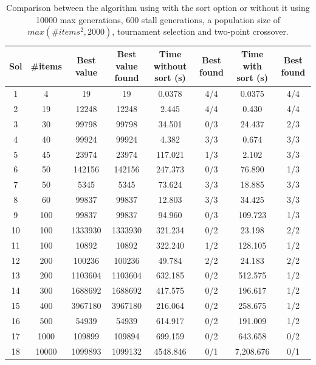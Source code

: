 \documentclass[anon]{CI}
\begin{document}
\begin{table}[htbp]
    \centering
    \begin{adjustbox}{max width=\textwidth}
    \begin{tabular}{|c|c|c|c|c|c|c|c|}
    \hline 
    Sol & \#items & Best value & \makecell{Best value\\found} & \makecell{Time\\without sort (s)} & Best found & \makecell{Time\\with sort (s)} & Best found\\
    \hline 
    1 & 4 & 19  & 19  & 0.0378 & 4/4 & 0.0375 & 4/4\\
    \hline 
    2 & 19 & 12248 & 12248 & 2.445 & 4/4 & 0.430 & 4/4\\
    \hline 
    3 & 30 & 99798  & 99798  & 34.501 & 0/3 & 24.437 & 2/3\\
    \hline 
    4 & 40 & 99924  & 99924  & 4.382 & 3/3 & 0.674 & 3/3\\
    \hline 
    5 & 45 & 23974  & 23974  & 117.021 & 1/3 & 2.102 & 3/3\\
    \hline 
    6 & 50 & 142156  & 142156  & 247.373 & 0/3 & 76.890 & 1/3\\
    \hline 
    7 & 50 & 5345  & 5345  & 73.624 & 3/3 & 18.885 & 3/3\\
    \hline 
    8 & 60 & 99837  & 99837  & 12.803 & 3/3 & 34.425 & 3/3\\
    \hline 
    9 & 100 & 99837  & 99837  & 94.960 & 0/3 & 109.723 & 1/3\\
    \hline 
    10 & 100 & 1333930  & 1333930  & 321.234 & 0/2 & 23.198 & 2/2\\
    \hline 
    11 & 100 & 10892  & 10892  & 322.240 & 1/2 & 128.105 & 1/2\\
    \hline 
    12 & 200 & 100236  & 100236  & 49.784 & 2/2 & 24.183 & 2/2\\
    \hline 
    13 & 200 & 1103604  & 1103604  & 632.185 & 0/2 & 512.575 & 1/2\\
    \hline 
    14 & 300 & 1688692  & 1688692  & 417.575 & 0/2 & 196.617 & 1/2\\
    \hline 
    15 & 400 & 3967180  & 3967180  & 216.064 & 0/2 & 258.675 & 1/2\\
    \hline 
    16 & 500 & 54939  & 54939  & 614.917 & 0/2 & 191.009 & 1/2\\
    \hline 
    17 & 1000 & 109899 & 109894 & 699.159 & 0/2 & 643.658 & 0/2\\
    \hline 
    18 & 10000 & 1099893 & 1099132 & 4548.846 & 0/1 & 7,208.676 & 0/1\\
    \hline 
    \end{tabular}
    \end{adjustbox}
    \caption{Comparison between the algorithm using with the sort option or without
    it using 10000 max generations, 600 stall generations, a population
    size of $max(\#items^{2},2000)$, tournament selection and two-point
    crossover.}
    \label{tab:results}
\end{table}
\end{document}
